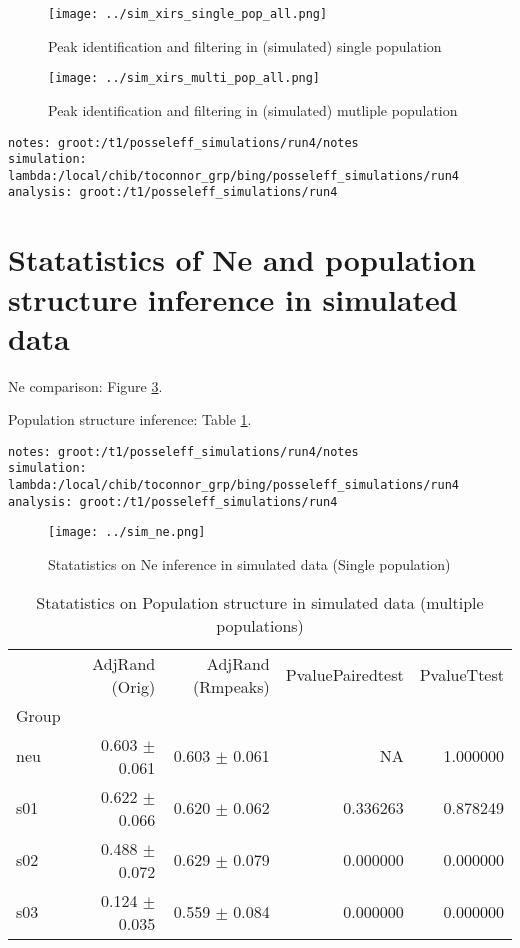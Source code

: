 \documentclass[11pt]{article}
\begin{document}
\begin{figure}
	\center
	\caption{Peak identification and filtering in (simulated) single population}
	\texttt{[image: ../sim\_xirs\_single\_pop\_all.png]}
	\label{fig:xirs_single_pop}
\end{figure}

\begin{figure}
	\center
	\caption{Peak identification and filtering in (simulated) mutliple population}
	\texttt{[image: ../sim\_xirs\_multi\_pop\_all.png]}
	\label{fig:xirs_multi_pop}
\end{figure}

\begin{verbatim}
notes: groot:/t1/posseleff_simulations/run4/notes
simulation: lambda:/local/chib/toconnor_grp/bing/posseleff_simulations/run4
analysis: groot:/t1/posseleff_simulations/run4
\end{verbatim}


\section{Statatistics of Ne and population structure inference in simulated data}

Ne comparison: Figure \ref{fig:sim_ne_cmp}.

\noindent
Population structure inference: Table \ref{tab:sim_popstruct_cmp}.

\begin{verbatim}
notes: groot:/t1/posseleff_simulations/run4/notes
simulation: lambda:/local/chib/toconnor_grp/bing/posseleff_simulations/run4
analysis: groot:/t1/posseleff_simulations/run4
\end{verbatim}

\begin{figure}
	\center
	\caption{Statatistics on Ne inference in simulated data (Single population)}
	\texttt{[image: ../sim\_ne.png]}
	\label{fig:sim_ne_cmp}
\end{figure}


\begin{table}
	\center
	\caption{Statatistics on Population structure in simulated data (multiple populations)}
	\begin{tabular}{lrrrr}
		\hline
		\hline
		      & AdjRand (Orig)     & AdjRand (Rmpeaks) & PvaluePairedtest & PvalueTtest \\
		Group &                    &                   &                  &             \\
		neu   & 0.603 $\pm$  0.061 & 0.603 $\pm$ 0.061 & NA               & 1.000000    \\
		s01   & 0.622 $\pm$  0.066 & 0.620 $\pm$ 0.062 & 0.336263         & 0.878249    \\
		s02   & 0.488 $\pm$  0.072 & 0.629 $\pm$ 0.079 & 0.000000         & 0.000000    \\
		s03   & 0.124 $\pm$  0.035 & 0.559 $\pm$ 0.084 & 0.000000         & 0.000000    \\
		\hline
		\hline
	\end{tabular}
	\label{tab:sim_popstruct_cmp}

\end{table}
\end{document}
